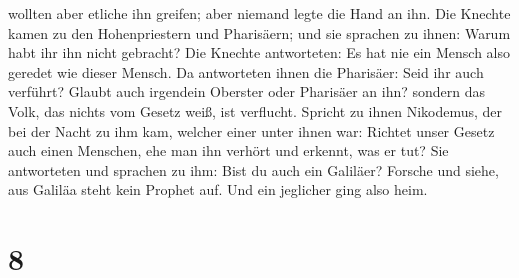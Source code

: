 wollten aber etliche ihn greifen; aber niemand legte die Hand an ihn.
 Die Knechte kamen zu den Hohenpriestern und Pharisäern;
und sie sprachen zu ihnen: Warum habt ihr ihn nicht gebracht?
 Die Knechte antworteten: Es hat nie ein Mensch also
geredet wie dieser Mensch.  Da antworteten ihnen die
Pharisäer: Seid ihr auch verführt?  Glaubt auch irgendein
Oberster oder Pharisäer an ihn?  sondern das Volk, das
nichts vom Gesetz weiß, ist verflucht.  Spricht zu ihnen
Nikodemus, der bei der Nacht zu ihm kam, welcher einer unter ihnen war:
 Richtet unser Gesetz auch einen Menschen, ehe man ihn
verhört und erkennt, was er tut?  Sie antworteten und
sprachen zu ihm: Bist du auch ein Galiläer? Forsche und siehe, aus
Galiläa steht kein Prophet auf.  Und ein jeglicher ging
also heim.

\hypertarget{section-7}{%
\section{8}\label{section-7}}

